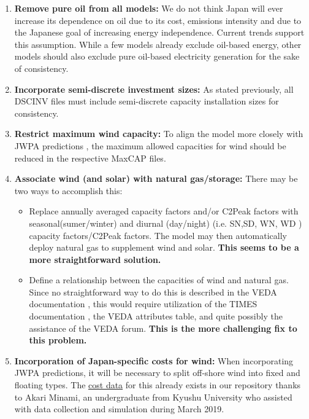 \documentclass[14pt,a4paper]{article} %
\begin{document}
\begin{enumerate}

\item \textbf{Remove pure oil from all models:} We do not think Japan will ever increase its dependence on oil due to its cost, emissions intensity and due to the Japanese goal of increasing energy independence. Current trends support this assumption. While a few models already exclude oil-based energy, other models should also exclude pure oil-based electricity generation for the sake of consistency.

\item \textbf{Incorporate semi-discrete investment sizes:} As stated previously, all DSCINV files must include semi-discrete capacity installation sizes for consistency.

\item \textbf{Restrict maximum wind capacity:} To align the model more closely with JWPA predictions \cite{heger_wind_2016}, the maximum allowed capacities for wind should be reduced in the respective MaxCAP files.

\item \textbf{Associate wind (and solar) with natural gas/storage:} There may be two ways to accomplish this:

\begin{itemize}

\item Replace annually averaged capacity factors and/or C2Peak factors with seasonal(sumer/winter) and diurnal (day/night) (i.e. SN,SD, WN, WD \cite{gargiulo_documentation_2005} ) capacity factors/C2Peak factors. The model may then automatically deploy natural gas to supplement wind and solar. \textbf{This seems to be a more straightforward solution.}

\item Define a relationship between the capacities of wind and natural gas. Since no straightforward way to do this is described in the VEDA documentation \cite{gargiulo_documentation_2005}, this would require utilization of the TIMES documentation \cite{loulou_documentation_2005}, the VEDA attributes table, and quite possibly the assistance of the VEDA forum. \textbf{This is the more challenging fix to this problem.}

\end{itemize}

\item \textbf{Incorporation of Japan-specific costs for wind:} When incorporating JWPA predictions, it will be necessary to split off-shore wind into fixed and floating types. The \href{https://github.com/arfc/i2cner/tree/master/data/japan_costs}{cost data} for this already exists in our repository thanks to Akari Minami, an undergraduate from Kyushu University who assisted with data collection and simulation during March 2019.


\end{enumerate}
\end{document}
